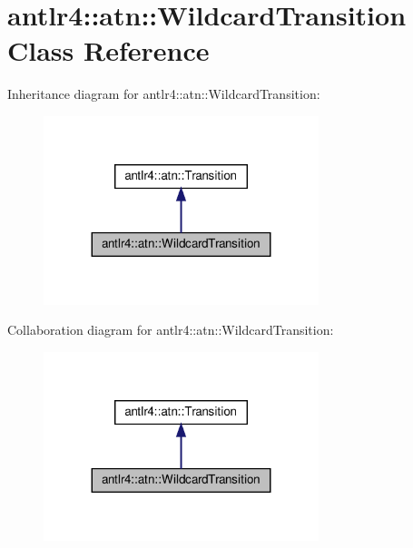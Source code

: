 \hypertarget{classantlr4_1_1atn_1_1WildcardTransition}{}\section{antlr4\+:\+:atn\+:\+:Wildcard\+Transition Class Reference}
\label{classantlr4_1_1atn_1_1WildcardTransition}


Inheritance diagram for antlr4\+:\+:atn\+:\+:Wildcard\+Transition\+:
\nopagebreak
\begin{figure}[H]
\begin{center}
\leavevmode
\includegraphics[width=227pt]{classantlr4_1_1atn_1_1WildcardTransition__inherit__graph}
\end{center}
\end{figure}


Collaboration diagram for antlr4\+:\+:atn\+:\+:Wildcard\+Transition\+:
\nopagebreak
\begin{figure}[H]
\begin{center}
\leavevmode
\includegraphics[width=227pt]{classantlr4_1_1atn_1_1WildcardTransition__coll__graph}
\end{center}
\end{figure}
